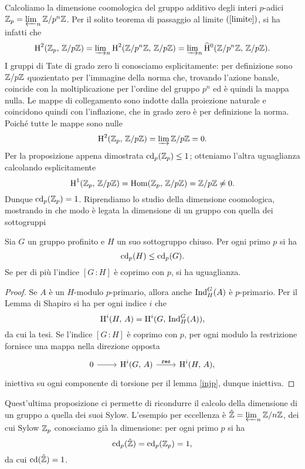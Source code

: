 Calcoliamo la dimensione coomologica del gruppo additivo degli interi $ p $-adici $ \mathbb{Z}_p = \varprojlim_n \mathbb{Z}/p^n\mathbb{Z} $. Per il solito teorema di passaggio al limite $ (\ref{limite}) $, si ha infatti che 
\[ \operatorname{H}^2(\mathbb{Z}_p , \, \mathbb{Z}/p\mathbb{Z}) = {\textstyle\varinjlim_n} \operatorname{H}^2(\mathbb{Z}/p^n\mathbb{Z}, \, \mathbb{Z}/p\mathbb{Z}) = {\textstyle\varinjlim_n} \operatorname{\widehat{H}^{0}}(\mathbb{Z}/p^n\mathbb{Z}, \, \mathbb{Z}/p\mathbb{Z}). \]
I gruppi di Tate di grado zero li conosciamo esplicitamente: per definizione sono $ \mathbb{Z}/p\mathbb{Z} $ quozientato per l'immagine della norma che, trovando l'azione banale, coincide con la moltiplicazione per l'ordine del gruppo $ p^n $ ed è quindi la mappa nulla. Le mappe di collegamento sono indotte dalla proiezione naturale e coincidono quindi con l'inflazione, che in grado zero è per definizione la norma. Poiché tutte le mappe sono nulle
\[ \operatorname{H}^2(\mathbb{Z}_p , \, \mathbb{Z}/p\mathbb{Z}) = \varinjlim \mathbb{Z}/p\mathbb{Z} = 0. \]
Per la proposizione appena dimostrata $ \operatorname{cd}_p(\mathbb{Z}_p) \leq 1 $; otteniamo l'altra uguaglianza calcolando esplicitamente $$  \operatorname{H}^1(\mathbb{Z}_p , \, \mathbb{Z}/p\mathbb{Z}) = \operatorname{Hom}(\mathbb{Z}_p , \, \mathbb{Z}/p\mathbb{Z}) = \mathbb{Z}/p\mathbb{Z} \neq 0.  $$
Dunque $ \operatorname{cd}_p(\mathbb{Z}_p) = 1 $.
Riprendiamo lo studio della dimensione coomologica, mostrando in che modo è legata la dimensione di un gruppo con quella dei sottogruppi

\begin{proposition}\label{cd2}
	Sia $ G $ un gruppo profinito e $ H $ un suo sottogruppo chiuso. Per ogni primo $ p $ si ha
	\[ \operatorname{cd}_p(H) \leq \operatorname{cd}_p(G). \]
	Se per di più l'indice $ [G\,\colon H] $ è coprimo con $ p $, si ha uguaglianza.
\end{proposition}
\begin{proof}
	Se $ A $ è un $ H $-modulo $ p $-primario, allora anche $ \operatorname{Ind}_H^G(A) $ è $ p $-primario. Per il Lemma di Shapiro si ha per ogni indice $ i $ che
	\[ \operatorname{H}^i(H, \, A) = \operatorname{H}^i(G, \, \operatorname{Ind}_H^G(A)),  \]
	da cui la tesi. Se l'indice $ [G\,\colon H] $ è coprimo con $ p $, per ogni modulo la restrizione fornisce una mappa nella direzione opposta
	\[\begin{tikzcd}
	0 \rar & \HH^i(G, \, A) \rar["\Res"] & \HH^i(H, \, A),
	\end{tikzcd}  \]
	iniettiva su ogni componente di torsione per il lemma \ref{injp}, dunque iniettiva.
\end{proof}

Quest'ultima proposizione ci permette di ricondurre il calcolo della dimensione di un gruppo a quella dei suoi Sylow. L'esempio per eccellenza è $ \hat{\mathbb{Z}} = \varprojlim_n \mathbb{Z}/n\mathbb{Z} $, dei cui Sylow $ \mathbb{Z}_p$ conosciamo già la dimensione: per ogni primo $ p $ si ha
\[ \operatorname{cd}_p(\hat{\mathbb{Z}}) = \operatorname{cd}_p(\mathbb{Z}_p) = 1, \]
da cui $ \operatorname{cd}(\hat{\mathbb{Z}})=1 $.\\

